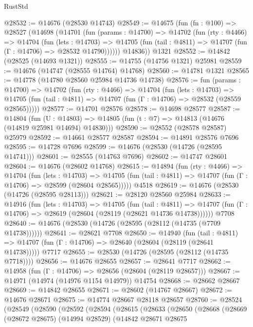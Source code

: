 \begin{lexlean}{RustStd}
\begin{coremodule}
@28532 := @14676 (@28530 @14743)
@28549 := @14675
    (fun (fn : @100) =>
    @28527
      (@14698
        (@14701
          (fun (params : @14700) =>
          @14702
            (fun (rty : @4466) =>
            @14704
              (fun (lets : @14703) =>
              @14705 (fun (tail : @4811) => @14707 (fun (Γ : @14706) => @28532 @14790))))))
        @14836))
    @1321
@28552 := @14842 (@28525 (@14693 @1321))
@28555 := @14755 (@14756 @1321) @25981
@28559 := @14676 (@14747 (@28555 @14764) @14768)
@28560 := @14781 @1321
@28565 := @14778 (@14780 @28560 @25984 @14736 @14738)
@28576 := fun (params : @14700) =>
  @14702
    (fun (rty : @4466) =>
    @14704
      (fun (lets : @14703) =>
      @14705 (fun (tail : @4811) => @14707 (fun (Γ : @14706) => @28532 (@28559 @28565)))))
@28577 := @14701 @28576
@28578 := @14698 @28577
@28587 := @14804
    (fun (U : @14803) => @14805 (fun (t : @7) => @14813 (@14676 (@14819 @25981 @14694) @14830)))
@28590 := @28552 (@28578 @28587) @25979
@28592 := @14661 @28577 @28587
@28594 := @14891 @28576 @7696
@28595 := @14728 @7696
@28599 := @14676 (@28530 (@14726 (@28595 @14741)))
@28601 := @28555 (@14763 @7696)
@28602 := @14747 @28601
@28604 := @14676 (@28602 @14768)
@28615 := @14894
    (fun (rty : @4466) =>
    @14704
      (fun (lets : @14703) =>
      @14705 (fun (tail : @4811) => @14707 (fun (Γ : @14706) => @28599 (@28604 @28565)))))
    @4518
@28619 := @14676 (@28530 (@14726 (@28595 @28113)))
@28621 := @28120 @28560 @25984
@28633 := @14916
    (fun (lets : @14703) =>
    @14705
      (fun (tail : @4811) =>
      @14707 (fun (Γ : @14706) => @28619 (@28604 (@28119 (@28621 @14736 @14738))))))
    @7708
@28640 := @14676 (@28530 (@14726 (@28595 (@28112 (@14735 (@7709 @14738))))))
@28641 := @28621 @7708
@28650 := @14940
    (fun (tail : @4811) => @14707 (fun (Γ : @14706) => @28640 (@28604 (@28119 (@28641 @14738)))))
    @7717
@28655 := @28530 (@14726 (@28595 (@28112 (@14735 @7718))))
@28656 := @14676 @28655
@28657 := @28641 @7717
@28662 := @14958 (fun (Γ : @14706) => @28656 (@28604 (@28119 @28657)))
@28667 := @14971 (@14974 (@14976 @1154 @14979)) @14754
@28668 := @28662 @28667
@28669 := @14842 @28655
@28671 := @28602 (@14767 @28667)
@28672 := @14676 @28671
@28675 := @14774 @28667 @28118 @28657
@28760 := @28524
    (@28549
      (@28590
        (@28592
          (@28594
            (@28615
              (@28633
                (@28650
                  (@28668
                    (@28669
                      (@28672 @28675)
                      (@14994 @28529)
                      (@14842
                        @28671
                        @28675

\end{coremodule}
\end{lexlean}
